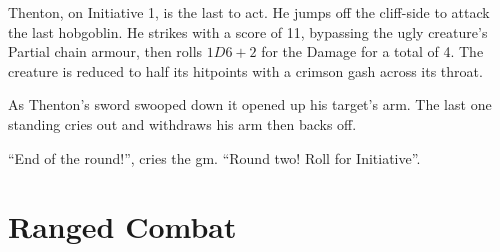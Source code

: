 \documentclass[titlepage,a4paper,openany]{book}
\begin{document}
\begin{multicols}{2}
{\begin{exampletext}
Thenton, on Initiative 1, is the last to act. He jumps off the cliff-side to attack the last hobgoblin. He strikes with a score of 11, bypassing the ugly creature's Partial chain armour, then rolls $1D6+2$ for the Damage for a total of 4. The creature is reduced to half its hitpoints with a crimson gash across its throat.

As Thenton's sword swooped down it opened up his target's arm. The last one standing cries out and withdraws his arm then backs off.

	``End of the \gls{round}!'', cries the \gls{gm}. ``Round two! Roll for Initiative''.
\end{exampletext}
}{}

\end{multicols}

\section{Ranged Combat}
\end{document}
